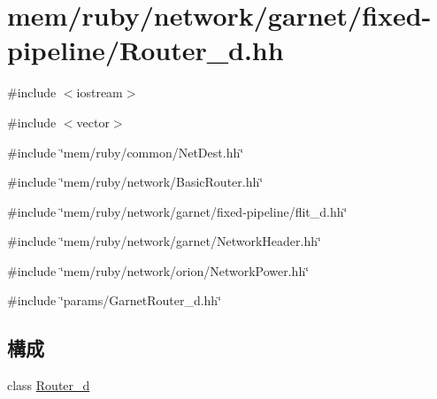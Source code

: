 \hypertarget{Router__d_8hh}{
\section{mem/ruby/network/garnet/fixed-\/pipeline/Router\_\-d.hh}
\label{Router__d_8hh}
}
{\ttfamily \#include $<$iostream$>$}\par
{\ttfamily \#include $<$vector$>$}\par
{\ttfamily \#include \char`\"{}mem/ruby/common/NetDest.hh\char`\"{}}\par
{\ttfamily \#include \char`\"{}mem/ruby/network/BasicRouter.hh\char`\"{}}\par
{\ttfamily \#include \char`\"{}mem/ruby/network/garnet/fixed-\/pipeline/flit\_\-d.hh\char`\"{}}\par
{\ttfamily \#include \char`\"{}mem/ruby/network/garnet/NetworkHeader.hh\char`\"{}}\par
{\ttfamily \#include \char`\"{}mem/ruby/network/orion/NetworkPower.hh\char`\"{}}\par
{\ttfamily \#include \char`\"{}params/GarnetRouter\_\-d.hh\char`\"{}}\par
\subsection*{構成}
\begin{DoxyCompactItemize}
\item 
class \hyperlink{classRouter__d}{Router\_\-d}
\end{DoxyCompactItemize}
